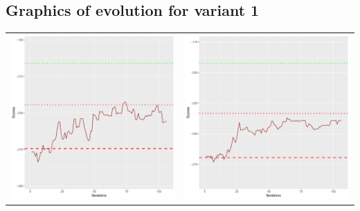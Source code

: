 \documentclass[]{scrartcl}
\begin{document}
\subsection{Graphics of evolution for variant 1}

\begin{table}[h!]
\begin{tabular}{cc}
\includegraphics[scale = 0.4]{./figs/asia/v1/10/boundsEvolution-107.pdf} & 
\includegraphics[scale = 0.4]{./figs/asia/v1/20/boundsEvolution-107.pdf} \\

\end{tabular}
\end{table}
\end{document}
